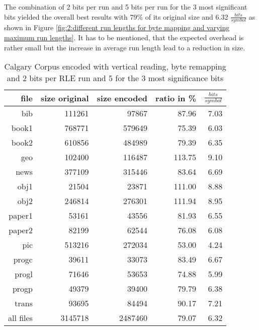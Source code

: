 \par{
The combination of 2 bits per run and 5 bits per run for the 3 most significant bits yielded the overall best results with 79\% of its original size and 6.32 $\frac{bits}{symbol}$ as shown in Figure \ref{fig:2:different run lengths for byte mapping and varying maximum run lengths}. It has to be mentioned, that the expected overhead is rather small but the increase in average run length lead to a reduction in size.
\begin{table}[H]
	\centering
	\begin{tabular}{r|r|r|r|r}	
		file & size original & size encoded & ratio in \% & $\frac{bits}{symbol}$\\
		\hline
		bib & 111261 & 97867 & 87.96 & 7.03\\
		book1 & 768771 & 579649 & 75.39 & 6.03 \\
		book2 & 610856 & 484989 & 79.39 & 6.35\\
		geo & 102400 & 116487 & 113.75 & 9.10\\
		news & 377109 & 315446 & 83.64 & 6.69\\
		obj1 & 21504 & 23871 & 111.00 & 8.88\\
		obj2& 246814 & 276301 & 111.94 & 8.95\\		 
		paper1 & 53161 & 43556 & 81.93 & 6.55\\		 
		paper2& 82199 & 62544 & 76.08 & 6.08\\		 
		pic & 513216 & 272034 & 53.00 & 4.24\\		 
		progc & 39611 & 33073 & 83.49 & 6.67\\		 
		progl & 71646 & 53653 & 74.88 & 5.99\\		 
		progp & 49379 & 39400 & 79.79 & 6.38\\		 
		trans & 93695 & 84494 & 90.17 & 7.21\\
		\hline
		all files & 3145718 & 2487460 & 79.07 & 6.32
	\end{tabular}
	\caption{Calgary Corpus encoded with vertical reading, byte remapping and 2 bits per RLE run and 5 for the 3 most significance bits}
\label{tab:t43 Calgary Corpus encoded with vertical reading, byte remapping and 2 bits per RLE run and 5 for the 3 most significance bits}
\end{table}
}

